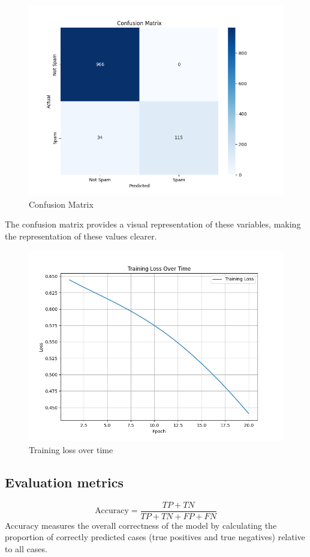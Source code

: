 \begin{figure}[H]
    \centering
    \caption{Confusion Matrix}
    \includegraphics[width=1.1\columnwidth]{confusion_matrix.png}
\end{figure}
\indent The confusion matrix provides a visual representation of these variables, making the representation of these values clearer.

\begin{figure}[H]
    \centering
    \caption{Training loss over time}
    \includegraphics[width=1.1\columnwidth]{training_loss.png}
\end{figure}

\subsection{Evaluation metrics}
\[
\text{Accuracy} = \frac{TP + TN}{TP + TN + FP + FN}
\]
\indent Accuracy measures the overall correctness of the model by calculating the proportion of correctly predicted cases (true positives and true negatives) relative to all cases.

